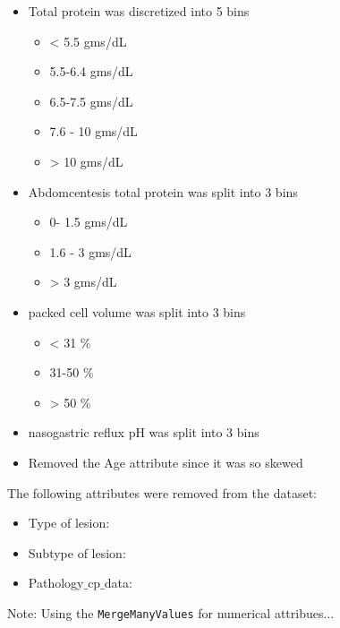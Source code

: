\begin{itemize}
\item Total protein was discretized into 5 bins
\begin{itemize}
\item < 5.5 gms/dL
\item 5.5-6.4 gms/dL
\item 6.5-7.5 gms/dL
\item 7.6 - 10 gms/dL
\item > 10 gms/dL
\end{itemize}


\item Abdomcentesis total protein was split into 3 bins
\begin{itemize}
\item 0- 1.5 gms/dL
\item 1.6 - 3 gms/dL
\item > 3 gms/dL
\end{itemize}

\item packed cell volume was split into 3 bins
\begin{itemize}
\item < 31 \%
\item 31-50 \%
\item > 50 \%
\end{itemize}

\item nasogastric reflux pH was split into 3 bins

\item Removed the Age attribute since it was so skewed


\end{itemize}


The following attributes were removed from the dataset:
\begin{itemize}
\item Type of lesion:
\item Subtype of lesion:
\item Pathology$\_ $cp$ \_$data:
\end{itemize}
Note: Using the \verb|MergeManyValues| for numerical attribues...
